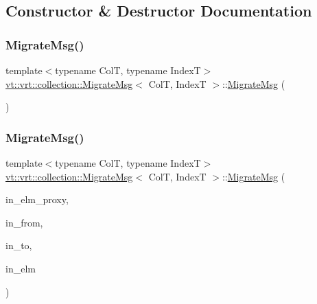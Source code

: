 \subsection{Constructor \& Destructor Documentation}
\mbox{\label{structvt_1_1vrt_1_1collection_1_1_migrate_msg_a0b41c5d241e067dadb4648653f9909bc}} 
\subsubsection{\texorpdfstring{Migrate\+Msg()}{MigrateMsg()}\hspace{0.1cm}{\footnotesize\ttfamily [1/2]}}
{\footnotesize\ttfamily template$<$typename ColT, typename IndexT$>$ \\
\hyperlink{structvt_1_1vrt_1_1collection_1_1_migrate_msg}{vt\+::vrt\+::collection\+::\+Migrate\+Msg}$<$ ColT, IndexT $>$\+::\hyperlink{structvt_1_1vrt_1_1collection_1_1_migrate_msg}{Migrate\+Msg} (\begin{DoxyParamCaption}{ }\end{DoxyParamCaption})\hspace{0.3cm}{\ttfamily [default]}}

\mbox{\label{structvt_1_1vrt_1_1collection_1_1_migrate_msg_a6246b857036c6e3b4ed3d62ed63eba63}} 
\subsubsection{\texorpdfstring{Migrate\+Msg()}{MigrateMsg()}\hspace{0.1cm}{\footnotesize\ttfamily [2/2]}}
{\footnotesize\ttfamily template$<$typename ColT, typename IndexT$>$ \\
\hyperlink{structvt_1_1vrt_1_1collection_1_1_migrate_msg}{vt\+::vrt\+::collection\+::\+Migrate\+Msg}$<$ ColT, IndexT $>$\+::\hyperlink{structvt_1_1vrt_1_1collection_1_1_migrate_msg}{Migrate\+Msg} (\begin{DoxyParamCaption}\item[{\hyperlink{structvt_1_1vrt_1_1collection_1_1_vrt_elm_proxy}{Vrt\+Elm\+Proxy}$<$ ColT, IndexT $>$ const \&}]{in\+\_\+elm\+\_\+proxy,  }\item[{\hyperlink{namespacevt_a866da9d0efc19c0a1ce79e9e492f47e2}{Node\+Type} const \&}]{in\+\_\+from,  }\item[{\hyperlink{namespacevt_a866da9d0efc19c0a1ce79e9e492f47e2}{Node\+Type} const \&}]{in\+\_\+to,  }\item[{ColT $\ast$}]{in\+\_\+elm }\end{DoxyParamCaption})\hspace{0.3cm}{\ttfamily [inline]}}



